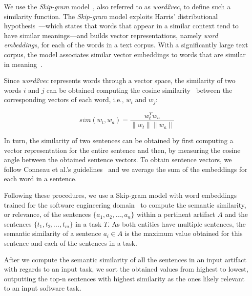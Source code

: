We use the \textit{Skip-gram} model~\cite{Mikolov2013}, also referred to as \textit{word2vec}, to define such a similarity function.
The \textit{Skip-gram} model exploits Harris' distributional hypothesis~\cite{harris1954distributional}---which states that words that appear in a similar context tend to have similar meanings---and builds vector representations, namely \textit{word embeddings}, for each of the words in a text corpus.
With a significantly large text corpus, the model associates similar vector embeddings to words that are similar in meaning~\cite{Ye2016}.


Since \textit{word2vec} represents words through a vector space, the similarity of two words $i$ and $j$ can be obtained computing the cosine similarity~\cite{Manning2009IR} between the corresponding vectors of each word, i.e., $w_i$ and $w_j$:

\begin{equation}
    sim(w_t,w_a) = \frac{w_t^Tw_a}{\|w_t\| \|w_a\|}
    \label{eq:word-sim}
\end{equation}
 
\smallskip
In turn, the similarity of two sentences can be obtained by first computing a vector representation for the entire sentence and then, by measuring the cosine angle between the obtained sentence vectors.
To obtain sentence vectors, we follow Conneau et al.'s guidelines~\cite{conneau2018}
and we average the sum of the embeddings for each word in a sentence.




Following these procedures, we use a Skip-gram model with word embeddings trained for the software engineering domain~\cite{Efstathiou2018} to compute the semantic similarity, or relevance, of the sentences $\{a_1, a_2, \dots, a_n\}$ within a pertinent artifact $A$ and the sentences $\{t_1, t_2, \dots, t_m\}$ in a task  $T$. As both entities have multiple sentences, the semantic similarity of a sentence $a_i \in A$ is the maximum value obtained for this sentence and each of the sentences in a task.


After we compute the semantic similarity of all the sentences in an input artifact with regards to an input task, we sort the obtained values from highest to lowest, outputting the top-n sentences with highest similarity as the ones likely relevant to an input software task.


    

